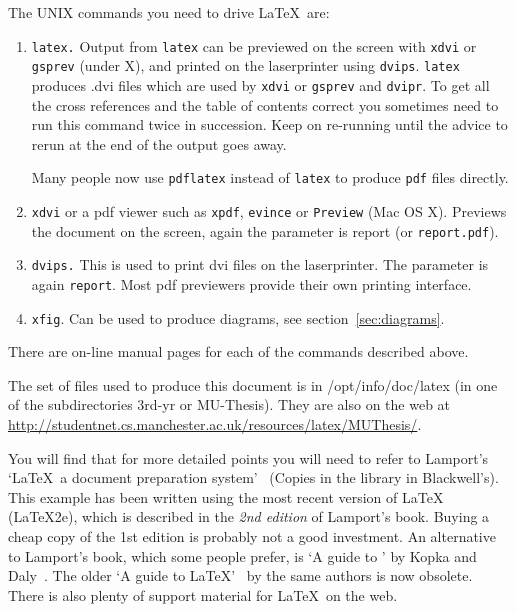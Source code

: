 The UNIX commands you need to drive \LaTeX\ are:
\begin{enumerate}
\item \texttt{latex.} Output from \texttt{latex} can be previewed on
  the screen with \texttt{xdvi} or \texttt{gsprev} (under X), and printed on the laserprinter using  \texttt{dvips}.
  \texttt{latex} produces \textsf{.dvi} files which are used by
  \texttt{xdvi} or \texttt{gsprev} and \texttt{dvipr}.  To get all the
  cross references and the table of contents correct you sometimes
  need to run this command twice in succession.  Keep on re-running
  until the advice to rerun at the end of the output goes away.

  Many people now use \texttt{pdflatex} instead of \texttt{latex} to produce \texttt{pdf} files directly.
  
\item \texttt{xdvi} or a pdf viewer such as \texttt{xpdf}, \texttt{evince} or \texttt{Preview} (Mac OS X). Previews the document on the
  screen, again the parameter is \textsf{report} (or \texttt{report.pdf}).
  
\item \texttt{dvips.} This is used to print dvi files on the laserprinter.  The
  parameter is again \texttt{report}. Most pdf previewers provide their own printing interface.
  
\item \texttt{xfig}. Can be used to produce diagrams, see
  section~\ref{sec:diagrams}.

\end{enumerate}
There are on-line manual pages for each of the commands described above.

The set of files used to produce this document is in
\textsf{/opt/info/doc/latex} (in one of the subdirectories
\textsf{3rd-yr} or \textsf{MU-Thesis}).  They are also on the web at \url{http://studentnet.cs.manchester.ac.uk/resources/latex/MUThesis/}. 

You will find that for more detailed points you will need to refer to
Lamport's `\LaTeX\ a document preparation system'~\cite{lamport}
(Copies in the library  in Blackwell's).
This example has been written using the most recent version of \LaTeX
(LaTeX2e), which is described in the \emph{2nd edition} of Lamport's
book. Buying a cheap copy of the 1st edition is probably not a good
investment. An alternative to Lamport's book, which some people
prefer, is `A guide to {\LaTeXe}' by Kopka and Daly~\cite{kopka}. The
older `A guide to {\LaTeX}'~\cite{kopka-old} by the same authors is
now obsolete. There is also plenty of support material for \LaTeX\ on the web.


